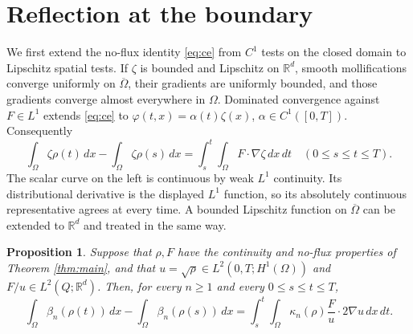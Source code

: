 \documentclass[11pt]{article}
\newtheorem{proposition}[theorem]{Proposition}
\newcommand{\R}{\mathbb R}
\newcommand{\dd}{\,dx}
\newcommand{\dt}{\,dt}
\newcommand{\grad}{\nabla}
\begin{document}
\section{Reflection at the boundary}\label{sec:boundary}
We first extend the no-flux identity \eqref{eq:ce} from $C^1$ tests on the
closed domain to Lipschitz spatial tests. If $\zeta$ is
bounded and Lipschitz on $\R^d$, smooth mollifications converge uniformly
on $\overline\Omega$, their gradients are uniformly bounded, and those
gradients converge almost everywhere in $\Omega$. Dominated convergence
against $F\in L^1$ extends \eqref{eq:ce} to
$\varphi(t,x)=\alpha(t)\zeta(x)$, $\alpha\in C^1([0,T])$.
Consequently
\begin{equation}\label{eq:lip-tests}
 \int_\Omega\zeta\rho(t)\dd-\int_\Omega\zeta\rho(s)\dd
  =\int_s^t\!\int_\Omega F\cdot\grad\zeta\dd\dt
 \quad(0\leq s\leq t\leq T).
\end{equation}
The scalar curve on the left is continuous by weak $L^1$ continuity. Its
distributional derivative is the displayed $L^1$ function, so its absolutely
continuous representative agrees at every time. A bounded Lipschitz function
on $\overline\Omega$ can be extended to $\R^d$ and treated in the same way.

\begin{proposition}\label{prop:global}
Suppose that $\rho,F$ have the continuity and no-flux properties of
Theorem \ref{thm:main}, and that
$u=\sqrt\rho\in L^2(0,T;H^1(\Omega))$ and
$F/u\in L^2(Q;\R^d)$. Then, for every $n\geq1$ and every
$0\leq s\leq t\leq T$,
\begin{equation}\label{eq:global-truncated}
 \int_\Omega\beta_n(\rho(t))\dd-\int_\Omega\beta_n(\rho(s))\dd
 =\int_s^t\!\int_\Omega
        \kappa_n(\rho)\frac Fu\cdot2\grad u\dd\dt.
\end{equation}
\end{proposition}
\end{document}
